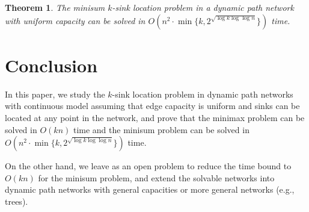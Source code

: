 \documentclass[a4paper]{llncs}
\newtheorem{thm}{Theorem}
\begin{document}
\begin{thm}
The minisum $k$-sink location problem in a dynamic path network with uniform capacity can be solved in $O(n^2 \cdot \min \{ k, 2^{\sqrt{\log k \log \log n}}\})$ time.
\label{thm:ms1}
\end{thm}

\section{Conclusion}
In this paper, we study the $k$-sink location problem in dynamic path networks with continuous model assuming that edge capacity is uniform and sinks can be located at any point in the network, and prove that the minimax problem can be solved in $O(kn)$ time and the minisum problem can be solved in $O(n^2 \cdot \min \{ k, 2^{\sqrt{\log k \log \log n}}\})$ time.

On the other hand, we leave as an open problem to reduce the time bound to $O(kn)$ for the minisum problem,
and extend the solvable networks into dynamic path networks with general capacities or more general networks (e.g., trees).







\clearpage
\end{document}
